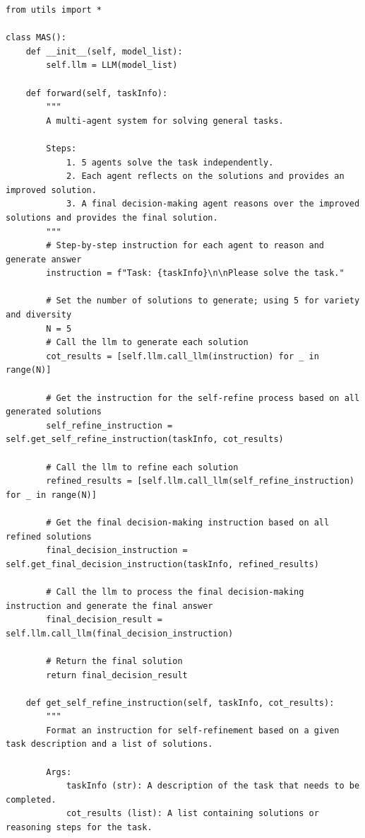 \documentclass{article}
\theoremstyle{plain}
\theoremstyle{definition}
\theoremstyle{remark}
\begin{document}
\newpage
\begin{lstlisting}[caption={Case 3: Multi-agent system generated by MAS-GPT. MAS-GPT can generate novel MAS.}, label={case3_mas}]
from utils import *

class MAS():
    def __init__(self, model_list):
        self.llm = LLM(model_list)

    def forward(self, taskInfo):
        """
        A multi-agent system for solving general tasks.

        Steps:
            1. 5 agents solve the task independently.
            2. Each agent reflects on the solutions and provides an improved solution.
            3. A final decision-making agent reasons over the improved solutions and provides the final solution.
        """
        # Step-by-step instruction for each agent to reason and generate answer
        instruction = f"Task: {taskInfo}\n\nPlease solve the task."

        # Set the number of solutions to generate; using 5 for variety and diversity
        N = 5
        # Call the llm to generate each solution
        cot_results = [self.llm.call_llm(instruction) for _ in range(N)]

        # Get the instruction for the self-refine process based on all generated solutions
        self_refine_instruction = self.get_self_refine_instruction(taskInfo, cot_results)

        # Call the llm to refine each solution
        refined_results = [self.llm.call_llm(self_refine_instruction) for _ in range(N)]

        # Get the final decision-making instruction based on all refined solutions
        final_decision_instruction = self.get_final_decision_instruction(taskInfo, refined_results)

        # Call the llm to process the final decision-making instruction and generate the final answer
        final_decision_result = self.llm.call_llm(final_decision_instruction)

        # Return the final solution
        return final_decision_result

    def get_self_refine_instruction(self, taskInfo, cot_results):
        """
        Format an instruction for self-refinement based on a given task description and a list of solutions.

        Args:
            taskInfo (str): A description of the task that needs to be completed.
            cot_results (list): A list containing solutions or reasoning steps for the task.


\end{lstlisting}
\end{document}
